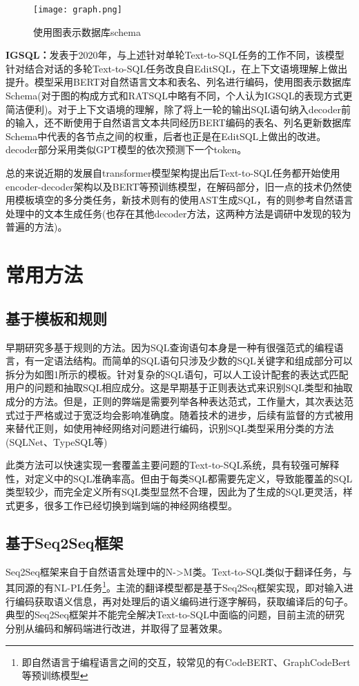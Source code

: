 \documentclass[lang=cn,a4paper,newtx]{elegantpaper}
\begin{document}
        \begin{figure}[h]
            \centering
            \texttt{[image: graph.png]}
            \caption{使用图表示数据库schema}
        \end{figure}

        \textbf{IGSQL\cite{12}：}发表于2020年，与上述针对单轮Text-to-SQL任务的工作不同，该模型针对结合对话的多轮Text-to-SQL任务改良自EditSQL\cite{13}，在上下文语境理解上做出提升。模型采用BERT对自然语言文本和表名、列名进行编码，使用图表示数据库Schema(对于图的构成方式和RATSQL\cite{11}中略有不同，个人认为IGSQL的表现方式更简洁便利)。对于上下文语境的理解，除了将上一轮的输出SQL语句纳入decoder前的输入，还不断使用于自然语言文本共同经历BERT编码的表名、列名更新数据库Schema中代表的各节点之间的权重，后者也正是在EditSQL\cite{13}上做出的改进。decoder部分采用类似GPT模型的依次预测下一个token。

        总的来说近期的发展自transformer模型架构提出后Text-to-SQL任务都开始使用encoder-decoder架构以及BERT等预训练模型，在解码部分，旧一点的技术仍然使用模板填空的多分类任务，新技术则有的使用AST生成SQL，有的则参考自然语言处理中的文本生成任务(也存在其他decoder方法，这两种方法是调研中发现的较为普遍的方法)。
\section{常用方法}
    \subsection{基于模板和规则}
    早期研究多基于规则的方法。因为SQL查询语句本身是一种有很强范式的编程语言，有一定语法结构。而简单的SQL语句只涉及少数的SQL关键字和组成部分可以拆分为如图1所示的模板。针对复杂的SQL语句，可以人工设计配套的表达式匹配用户的问题和抽取SQL相应成分。这是早期基于正则表达式来识别SQL类型和抽取成分的方法。但是，正则的弊端是需要列举各种表达范式，工作量大，其次表达范式过于严格或过于宽泛均会影响准确度。随着技术的进步，后续有监督的方式被用来替代正则，如使用神经网络对问题进行编码，识别SQL类型采用分类的方法(SQLNet\cite{7}、TypeSQL\cite{8}等)

    此类方法可以快速实现一套覆盖主要问题的Text-to-SQL系统，具有较强可解释性，对定义中的SQL准确率高。但由于每类SQL都需要先定义，导致能覆盖的SQL类型较少，而完全定义所有SQL类型显然不合理，因此为了生成的SQL更灵活，样式更多，很多工作已经切换到端到端的神经网络模型。
    \subsection{基于Seq2Seq框架}
    Seq2Seq框架来自于自然语言处理中的N->M类。Text-to-SQL类似于翻译任务，与其同源的有NL-PL任务\footnote{即自然语言于编程语言之间的交互，较常见的有CodeBERT、GraphCodeBert等预训练模型}。主流的翻译模型都是基于Seq2Seq框架实现，即对输入进行编码获取语义信息，再对处理后的语义编码进行逐字解码，获取编译后的句子。典型的Seq2Seq框架并不能完全解决Text-to-SQL中面临的问题，目前主流的研究分别从编码和解码端进行改进，并取得了显著效果。
\end{document}
